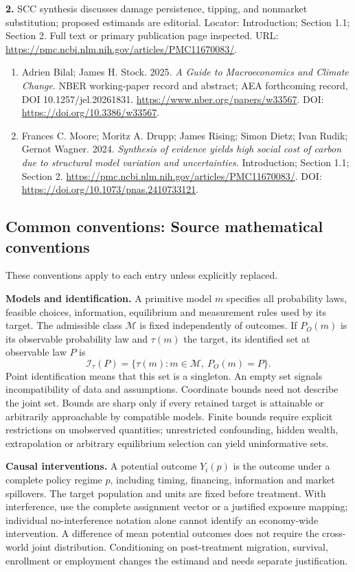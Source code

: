\documentclass[11pt,a4paper]{article}
\begin{document}
\textbf{2.} SCC synthesis discusses damage persistence, tipping, and nonmarket substitution; proposed estimands are editorial. Locator: Introduction; Section 1.1; Section 2. Full text or primary publication page inspected. URL: \url{https://pmc.ncbi.nlm.nih.gov/articles/PMC11670083/}.
\begin{enumerate}\raggedright
\item\hypertarget{definitions:source:30007712:1}{} Adrien Bilal; James H. Stock. 2025. \emph{A Guide to Macroeconomics and Climate Change}. NBER working-paper record and abstract; AEA forthcoming record, DOI 10.1257/jel.20261831.
\url{https://www.nber.org/papers/w33567}.
DOI: \url{https://doi.org/10.3386/w33567}.
\item\hypertarget{definitions:source:30007712:2}{} Frances C. Moore; Moritz A. Drupp; James Rising; Simon Dietz; Ivan Rudik; Gernot Wagner. 2024. \emph{Synthesis of evidence yields high social cost of carbon due to structural model variation and uncertainties}. Introduction; Section 1.1; Section 2.
\url{https://pmc.ncbi.nlm.nih.gov/articles/PMC11670083/}.
DOI: \url{https://doi.org/10.1073/pnas.2410733121}.
\end{enumerate}

\subsection*{Common conventions: Source mathematical conventions}

These conventions apply to each entry unless explicitly replaced.

\textbf{Models and identification.} A primitive model \(m\) specifies all probability laws, feasible choices, information, equilibrium and measurement rules used by its target. The admissible class \(\mathcal M\) is fixed independently of outcomes. If \(P_O(m)\) is its observable probability law and \(\tau(m)\) the target, its identified set at observable law \(P\) is
\[
 \mathcal I_\tau(P)=\{\tau(m):m\in\mathcal M,\ P_O(m)=P\}.
\]
Point identification means that this set is a singleton. An empty set signals incompatibility of data and assumptions. Coordinate bounds need not describe the joint set. Bounds are sharp only if every retained target is attainable or arbitrarily approachable by compatible models. Finite bounds require explicit restrictions on unobserved quantities; unrestricted confounding, hidden wealth, extrapolation or arbitrary equilibrium selection can yield uninformative sets.

\textbf{Causal interventions.} A potential outcome \(Y_i(p)\) is the outcome under a complete policy regime \(p\), including timing, financing, information and market spillovers. The target population and units are fixed before treatment. With interference, use the complete assignment vector or a justified exposure mapping; individual no-interference notation alone cannot identify an economy-wide intervention. A difference of mean potential outcomes does not require the cross-world joint distribution. Conditioning on post-treatment migration, survival, enrollment or employment changes the estimand and needs separate justification.
\end{document}
